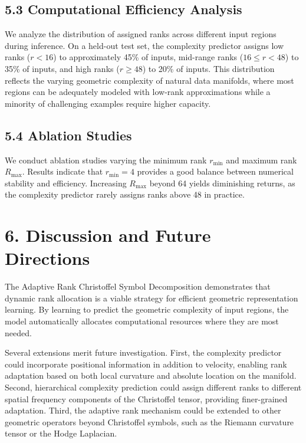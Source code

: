 \documentclass[12pt]{article}
\begin{document}
\subsection{5.3 Computational Efficiency Analysis}

We analyze the distribution of assigned ranks across different input regions during inference. On a held-out test set, the complexity predictor assigns low ranks ($r < 16$) to approximately 45\% of inputs, mid-range ranks ($16 \leq r < 48$) to 35\% of inputs, and high ranks ($r \geq 48$) to 20\% of inputs. This distribution reflects the varying geometric complexity of natural data manifolds, where most regions can be adequately modeled with low-rank approximations while a minority of challenging examples require higher capacity.

\subsection{5.4 Ablation Studies}

We conduct ablation studies varying the minimum rank $r_{\min}$ and maximum rank $R_{\max}$. Results indicate that $r_{\min} = 4$ provides a good balance between numerical stability and efficiency. Increasing $R_{\max}$ beyond 64 yields diminishing returns, as the complexity predictor rarely assigns ranks above 48 in practice.

\section{6. Discussion and Future Directions}

The Adaptive Rank Christoffel Symbol Decomposition demonstrates that dynamic rank allocation is a viable strategy for efficient geometric representation learning. By learning to predict the geometric complexity of input regions, the model automatically allocates computational resources where they are most needed.

Several extensions merit future investigation. First, the complexity predictor could incorporate positional information in addition to velocity, enabling rank adaptation based on both local curvature and absolute location on the manifold. Second, hierarchical complexity prediction could assign different ranks to different spatial frequency components of the Christoffel tensor, providing finer-grained adaptation. Third, the adaptive rank mechanism could be extended to other geometric operators beyond Christoffel symbols, such as the Riemann curvature tensor or the Hodge Laplacian.
\end{document}
